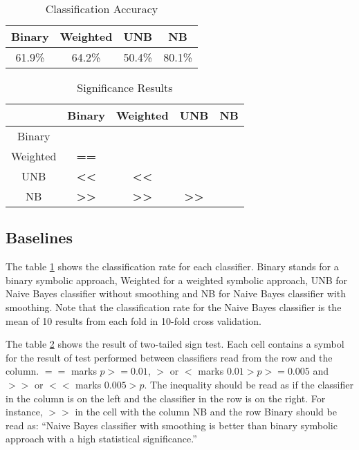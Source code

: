 
\begin{table}[]
\centering
\caption{Classification Accuracy}
\label{tab:crate}
\begin{tabular}{|c|c|c|c|}
\hline
Binary & Weighted & UNB & NB     \\ \hline
61.9\% & 64.2\% & 50.4\%  & 80.1\% \\ \hline
\end{tabular}
\end{table}
\begin{table}[]
\centering
\caption{Significance Results}
\label{tab:comp}
\begin{tabular}{|c|c|c|c|c|}
\hline
\textbf{} & Binary                            & Weighted    & UNB                      & NB        \\ \hline
Binary    & \textbf{}                         & \textbf{}     & \textbf{}                    & \textbf{} \\ \hline
Weighted  & \textbf{==}                       & \textbf{}  & \textbf{}                       & \textbf{} \\ \hline
UNB        & \textbf{\textless\textless} & \textbf{\textless\textless}&\textbf{} & \textbf{} \\ \hline
NB        & \textbf{\textgreater\textgreater} & \textbf{\textgreater\textgreater}&\textbf{\textgreater\textgreater} & \textbf{} \\ \hline
\end{tabular}
\end{table}
\subsection{Baselines}
The table \ref{tab:crate} shows the classification rate for each classifier. Binary stands for a binary symbolic approach, Weighted for a weighted symbolic approach, UNB for Naive Bayes classifier without smoothing and NB for Naive Bayes classifier with smoothing. Note that the classification rate for the Naive Bayes classifier is the mean of 10 results from each fold in 10-fold cross validation.

The table \ref{tab:comp} shows the result of two-tailed sign test. Each cell contains a symbol for the result of test performed between classifiers read from the row and the column. $==$ marks $p >= 0.01$, $>$ or $<$ marks $0.01 > p >= 0.005$ and  $>>$ or $<<$ marks $0.005 > p$. The inequality should be read as if the classifier in the column is on the left and the classifier in the row  is on the right. For instance, $>>$ in the cell with the column NB and the row Binary should be read as: ``Naive Bayes classifier with smoothing is better than binary symbolic approach with a high statistical significance.''


